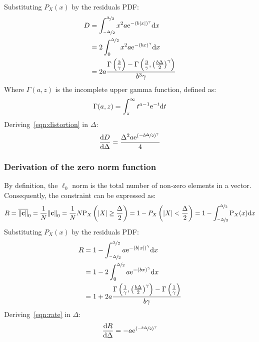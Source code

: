 \documentclass[11pt,a4paper,openright,twoside]{book}
\numberwithin{equation}{section} %
\numberwithin{figure}{section} %
\numberwithin{table}{section} %
\begin{document}
Substituting $P_X(x)$ by the residuals \ac{PDF}:
\begin{align}
	D
	&=\int_{\nicefrac{-\Delta}{2}}^{\nicefrac{\Delta}{2}}
	x^2 a \text{e}^{-{\left(b\vert x \vert\right)}^\gamma} \text{d} x \\
	&=2 \int_0^{\nicefrac{\Delta}{2}}
	x^2 a \text{e}^{-{\left(b x \right)}^\gamma} \text{d} x\\
	&=
		2a \frac{\Gamma\left(\frac{3}{\gamma}\right)-
		\Gamma\left(
		\frac{3}{\gamma},{\left(\frac{b\Delta}{2}\right)}^\gamma
		\right)}{b^3\gamma}
	\label{eqn:distortion}
\end{align}
Where $\Gamma(a,z)$ is the incomplete upper gamma function, defined as:
\begin{equation}
	\Gamma(a,z)=\int_z^\infty t^{a-1}\text{e}^{-t}\text{d} t
\end{equation}
Deriving~\eqref{eqn:distortion} in $\Delta$:
\begin{equation}
	\frac{\text{d} D}{\text{d}\Delta} =
	\frac{\Delta^2 a \text{e}^{{(-b\nicefrac{\Delta}{2})}^\gamma}}{4}
	\label{eqn:diff_distortion}
\end{equation}

\subsubsection{Derivation of the zero norm function}
\label{ssub:derivation_of_the_zero_norm_function}

By definition, the $\ell_0$ norm is the total number of non-zero
elements in a vector.
Consequently, the constraint can be expressed as:
\begin{equation}
	R 
	= \overline{\Vert \mathbf{c} \Vert}_0 = \frac{1}{N}{\Vert \mathbf{c} \Vert}_0
	= \frac{1}{N} N \text{P}_X\left(\vert X \vert \ge \frac{\Delta}{2}\right)
	= 1-P_X\left(\vert X \vert < \frac{\Delta}{2}\right)
	= 1-\int_{\nicefrac{-\Delta}{2}}^{\nicefrac{\Delta}{2}}\text{P}_X(x)\text{d} x
	\label{eqn:int_rate}
\end{equation}
Substituting $P_X(x)$ by the residuals \ac{PDF}:
\begin{align}
	R
	&=1-\int_{\nicefrac{-\Delta}{2}}^{\nicefrac{\Delta}{2}}
	a \text{e}^{-{\left(b\vert x \vert\right)}^\gamma} \text{d} x \\
	&=1-2\int_0^{\nicefrac{\Delta}{2}}
	a \text{e}^{-{\left(b x \right)}^\gamma} \text{d} x \\
	&=1+2a\frac{\Gamma\left(
		\frac{1}{\gamma},{\left(\frac{b\Delta}{2}\right)}^\gamma\right)-
		\Gamma\left(\frac{1}{\gamma}\right)}
		{b\gamma}
	\label{eqn:rate}
\end{align}
Deriving~\eqref{eqn:rate} in $\Delta$:
\begin{equation}
	\frac{\text{d} R}{\text{d}\Delta} =
	-a\text{e}^{{\left(\nicefrac{-b\Delta}{2}\right)}^\gamma}
	\label{eqn:diff_rate}
\end{equation}
\end{document}
